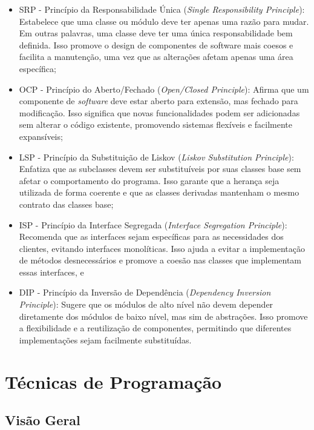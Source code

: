 \begin{itemize}

	\item SRP - Princípio da Responsabilidade Única (\textit{Single Responsibility Principle}): Estabelece 
    que uma classe ou módulo deve ter apenas uma razão para mudar. Em outras palavras, uma classe deve ter 
    uma única responsabilidade bem definida. Isso promove o design de componentes de software mais coesos 
    e facilita a manutenção, uma vez que as alterações afetam apenas uma área específica;
	\item OCP - Princípio do Aberto/Fechado (\textit{Open/Closed Principle}): Afirma que um componente de 
    \textit{software} deve estar aberto para extensão, mas fechado para modificação. Isso significa que novas 
    funcionalidades podem ser adicionadas sem alterar o código existente, promovendo sistemas flexíveis 
    e facilmente expansíveis;
	\item LSP - Princípio da Substituição de Liskov (\textit{Liskov Substitution Principle}): Enfatiza que 
    as subclasses devem ser substituíveis por suas classes base sem afetar o comportamento do programa. 
    Isso garante que a herança seja utilizada de forma coerente e que as classes derivadas mantenham o 
    mesmo contrato das classes base;
	\item ISP - Princípio da Interface Segregada (\textit{Interface Segregation Principle}): Recomenda que 
    as interfaces sejam específicas para as necessidades dos clientes, evitando interfaces monolíticas. 
    Isso ajuda a evitar a implementação de métodos desnecessários e promove a coesão nas classes que 
    implementam essas interfaces, e
	\item DIP - Princípio da Inversão de Dependência (\textit{Dependency Inversion Principle}): Sugere que 
    os módulos de alto nível não devem depender diretamente dos módulos de baixo nível, mas sim de abstrações. 
    Isso promove a flexibilidade e a reutilização de componentes, permitindo que diferentes implementações 
    sejam facilmente substituídas.
    
\end{itemize}

\section{Técnicas de Programação}
\label{sectionTecnicas}

\subsection{Visão Geral}

